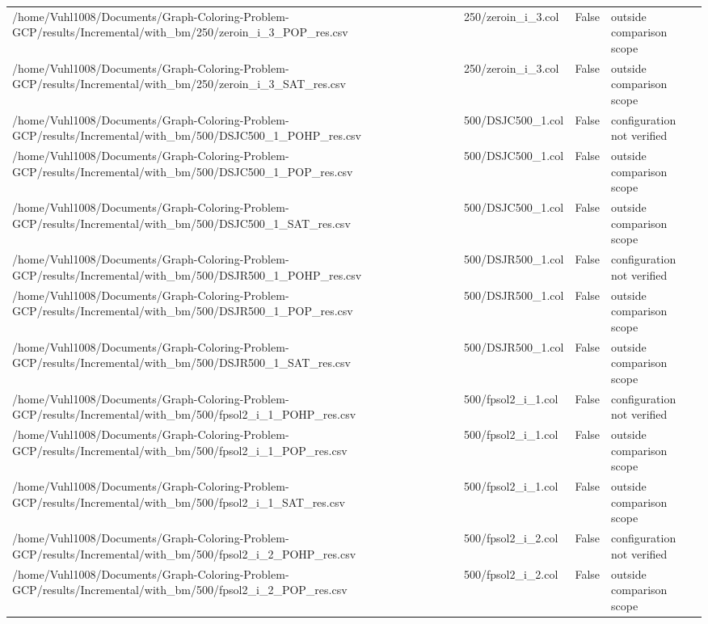 \begin{table}[htbp]
\begin{tabular}{llll}
/home/Vuhl1008/Documents/Graph-Coloring-Problem-GCP/results/Incremental/with\_bm/250/zeroin\_i\_3\_POP\_res.csv & 250/zeroin\_i\_3.col & False & outside comparison scope \\
/home/Vuhl1008/Documents/Graph-Coloring-Problem-GCP/results/Incremental/with\_bm/250/zeroin\_i\_3\_SAT\_res.csv & 250/zeroin\_i\_3.col & False & outside comparison scope \\
/home/Vuhl1008/Documents/Graph-Coloring-Problem-GCP/results/Incremental/with\_bm/500/DSJC500\_1\_POHP\_res.csv & 500/DSJC500\_1.col & False & configuration not verified \\
/home/Vuhl1008/Documents/Graph-Coloring-Problem-GCP/results/Incremental/with\_bm/500/DSJC500\_1\_POP\_res.csv & 500/DSJC500\_1.col & False & outside comparison scope \\
/home/Vuhl1008/Documents/Graph-Coloring-Problem-GCP/results/Incremental/with\_bm/500/DSJC500\_1\_SAT\_res.csv & 500/DSJC500\_1.col & False & outside comparison scope \\
/home/Vuhl1008/Documents/Graph-Coloring-Problem-GCP/results/Incremental/with\_bm/500/DSJR500\_1\_POHP\_res.csv & 500/DSJR500\_1.col & False & configuration not verified \\
/home/Vuhl1008/Documents/Graph-Coloring-Problem-GCP/results/Incremental/with\_bm/500/DSJR500\_1\_POP\_res.csv & 500/DSJR500\_1.col & False & outside comparison scope \\
/home/Vuhl1008/Documents/Graph-Coloring-Problem-GCP/results/Incremental/with\_bm/500/DSJR500\_1\_SAT\_res.csv & 500/DSJR500\_1.col & False & outside comparison scope \\
/home/Vuhl1008/Documents/Graph-Coloring-Problem-GCP/results/Incremental/with\_bm/500/fpsol2\_i\_1\_POHP\_res.csv & 500/fpsol2\_i\_1.col & False & configuration not verified \\
/home/Vuhl1008/Documents/Graph-Coloring-Problem-GCP/results/Incremental/with\_bm/500/fpsol2\_i\_1\_POP\_res.csv & 500/fpsol2\_i\_1.col & False & outside comparison scope \\
/home/Vuhl1008/Documents/Graph-Coloring-Problem-GCP/results/Incremental/with\_bm/500/fpsol2\_i\_1\_SAT\_res.csv & 500/fpsol2\_i\_1.col & False & outside comparison scope \\
/home/Vuhl1008/Documents/Graph-Coloring-Problem-GCP/results/Incremental/with\_bm/500/fpsol2\_i\_2\_POHP\_res.csv & 500/fpsol2\_i\_2.col & False & configuration not verified \\
/home/Vuhl1008/Documents/Graph-Coloring-Problem-GCP/results/Incremental/with\_bm/500/fpsol2\_i\_2\_POP\_res.csv & 500/fpsol2\_i\_2.col & False & outside comparison scope \\

\end{tabular}
\end{table}
